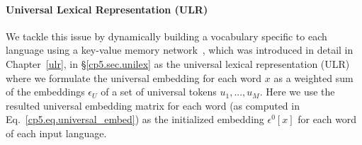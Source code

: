 
\paragraph{Universal Lexical Representation (ULR)} 

We tackle this issue by dynamically building a vocabulary specific to each language using a key-value memory network~\citep{miller2016key,gulcehre2018dynamic}, which was introduced in detail in Chapter~\ref{ulr}, in \S\ref{cp5.sec.unilex} as the universal lexical representation (ULR) where we formulate the universal embedding for each word $x$ as a weighted sum of the embeddings $\epsilon_U$ of a set of universal tokens $u_1, ..., u_M$. Here we use the resulted universal embedding matrix for each word (as computed in Eq.~\eqref{cp5.eq.universal_embed}) as the initialized embedding $\epsilon^0[x]$ for each word of each input language.



